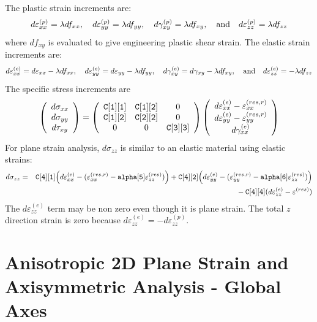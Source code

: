 \documentclass[11pt]{book}
\def\code#1{{\small\tt #1}}
\def\e#1{\varepsilon_{#1}}
\def\er#1{\varepsilon_{#1}^{(res)}}
\def\err#1{\varepsilon_{#1}^{(res,r)}}
\def\g#1{\gamma_{#1}}
\def\s#1{\sigma_{#1}}
\def\t#1{\tau_{#1}}
\def\vvec#1#2#3{\left(\begin{array}{ccc} #1 \\ #2 \\ #3 \end{array}\right)}
\begin{document}
 The plastic strain increments are:
\begin{equation}
       d\varepsilon_{xx}^{(p)} = \lambda df_{xx}, \quad
       d\varepsilon_{yy}^{(p)} = \lambda df_{yy}, \quad
       d\gamma_{xy}^{(p)} =  \lambda df_{xy}, \quad  {\rm and} \quad
       d\varepsilon_{zz}^{(p)} = \lambda df_{zz}
\end{equation}
where $df_{xy}$ is evaluated to give engineering plastic shear strain. The elastic strain increments are:
\begin{equation}
       d\varepsilon_{xx}^{(e)} = d\varepsilon_{xx} -\lambda df_{xx}, \quad
       d\varepsilon_{yy}^{(e)} = d\varepsilon_{yy} -\lambda df_{yy}, \quad
       d\gamma_{xy}^{(e)} = d\gamma_{xy} -  \lambda df_{xy}, \quad  {\rm and} \quad
       d\varepsilon_{zz}^{(e)} =  -\lambda df_{zz}
\end{equation}
The specific stress increments are
\begin{equation}
      \vvec{d\s{xx}}{d\s{yy}}{d\t{xy}} = \left(\begin{array}{ccc}
      		\code{C[1][1]} & \code{C[1][2]} & 0 \\
      		\code{C[1][2]} & \code{C[2][2]} &0 \\
      		0 & 0 & \code{C[3][3]} 
           \end{array}\right)
          \vvec{d\varepsilon_{xx}^{(e)}  - \err{xx}}{d\varepsilon_{yy}^{(e)}  -\err{yy}}{d\g{xx}^{(e)}}
 \end{equation}
For plane strain analysis, $d\sigma_{zz}$ is similar to an elastic material using elastic strains:
 \begin{eqnarray}
     d\s{zz} & = & \code{C[4][1]} \Bigl(d\e{xx}^{(e)} -(\err{xx}-\code{alpha[5]}\er{zz})\Bigr)
                         +  \code{C[4][2]}\Bigl(d\e{yy}^{(e)} -(\err{yy}-\code{alpha[6]}\er{zz})\Bigr) 
     \nonumber \\
     && \qquad\qquad\mbox{}
                   - \code{C[4][4]}(d\e{zz}^{(e)}-\er{})
\end{eqnarray}
The $d\e{zz}^{(e)}$ term may be non zero even though it is plane strain. The total $z$ direction strain is zero because $d\e{zz}^{(e)} = -d\e{zz}^{(p)}$.

\section{Anisotropic 2D Plane Strain and Axisymmetric Analysis - Global Axes}
\end{document}
